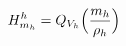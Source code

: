 \documentclass[preview]{standalone}
\begin{document}
\begin{align*}
\special{dvisvgm:raw <g id='unique000'>}H^h_{m_h}=Q_{V_h}\Big(\frac{m_h}{\rho_h}\Big)\special{dvisvgm:raw </g>}
\end{align*}
\end{document}
